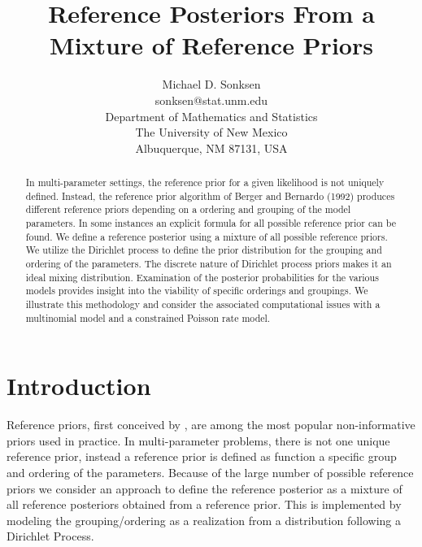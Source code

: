 \documentclass[11pt,a4paper,notitlepage]{article}
\begin{document}
\title{Reference Posteriors From a Mixture of Reference Priors} 
\author{
    Michael D. Sonksen \\
    \small sonksen@stat.unm.edu \\
    \small Department of Mathematics and Statistics\\
    \small The University of New Mexico\\
    \small Albuquerque, NM 87131, USA
}
\maketitle

\begin{abstract}
In multi-parameter settings, the reference prior for a given
likelihood is not uniquely defined.  Instead, the reference prior
algorithm of Berger and Bernardo (1992) produces different reference
priors depending on a ordering and grouping of the model parameters.
In some instances an explicit formula for all possible reference prior
can be found.  We define a reference posterior using a mixture of all
possible reference priors.  We utilize the Dirichlet process to define
the prior distribution for the grouping and ordering of the
parameters.  The discrete nature of Dirichlet process priors makes it
an ideal mixing distribution.  Examination of the posterior
probabilities for the various models provides insight into the
viability of specific orderings and groupings.  We illustrate this
methodology and consider the associated computational issues with
a multinomial model and a constrained Poisson rate model.
\end{abstract}


\section{Introduction}

Reference priors, first conceived by \cite{Bernardo1979}, are among
the most popular non-informative priors used in practice.  In
multi-parameter problems, there is not one unique reference prior,
instead a reference prior is defined as function a specific group and
ordering of the parameters.  Because of the large number of possible
reference priors we consider an approach to define the reference
posterior as a mixture of all reference posteriors obtained from a
reference prior.  This is implemented by modeling the
grouping/ordering as a realization from a distribution following a
Dirichlet Process.
\end{document}
